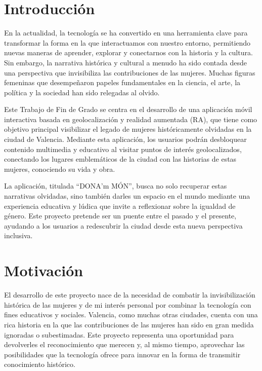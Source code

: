 
\section{Introducción}

En la actualidad, la tecnología se ha convertido en una herramienta clave para transformar la forma en la que interactuamos con nuestro entorno, permitiendo nuevas maneras de aprender, explorar y conectarnos con la historia y la cultura. Sin embargo, la narrativa histórica y cultural a menudo ha sido contada desde una perspectiva que invisibiliza las contribuciones de las mujeres. Muchas figuras femeninas que desempeñaron papeles fundamentales en la ciencia, el arte, la política y la sociedad han sido relegadas al olvido.

Este Trabajo de Fin de Grado se centra en el desarrollo de una aplicación móvil interactiva basada en geolocalización y realidad aumentada (RA), que tiene como objetivo principal visibilizar el legado de mujeres históricamente olvidadas en la ciudad de Valencia. Mediante esta aplicación, los usuarios podrán desbloquear contenido multimedia y educativo al visitar puntos de interés geolocalizados, conectando los lugares emblemáticos de la ciudad con las historias de estas mujeres, conociendo su vida y obra.

La aplicación, titulada “DONA’m MÓN”, busca no solo recuperar estas narrativas olvidadas, sino también darles un espacio en el mundo mediante una experiencia educativa y lúdica que invite a reflexionar sobre la igualdad de género. Este proyecto pretende ser un puente entre el pasado y el presente, ayudando a los usuarios a redescubrir la ciudad desde esta nueva perspectiva inclusiva.

\section{Motivación}
El desarrollo de este proyecto nace de la necesidad de combatir la invisibilización histórica de las mujeres y de mi interés personal por combinar la tecnología con fines educativos y sociales. Valencia, como muchas otras ciudades, cuenta con una rica historia en la que las contribuciones de las mujeres han sido en gran medida ignoradas o subestimadas. Este proyecto representa una oportunidad para devolverles el reconocimiento que merecen y, al mismo tiempo, aprovechar las posibilidades que la tecnología ofrece para innovar en la forma de transmitir conocimiento histórico.

